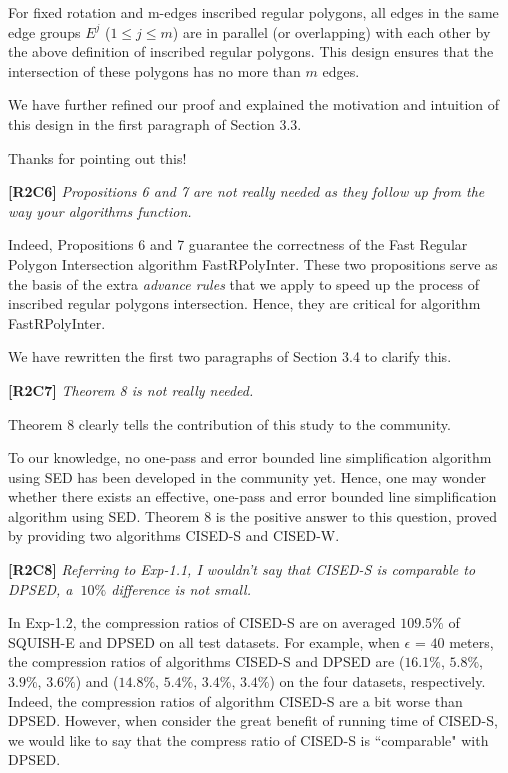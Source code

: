 \documentclass{letter}
\begin{document}
For fixed rotation and m-edges inscribed regular polygons,  all edges in the same edge groups $E^j$ ($1\le j\le m$) are in parallel (or overlapping) with each other by the above definition of inscribed regular polygons. This design ensures that the intersection of these polygons has no more than $m$ edges.

We have further refined our proof and explained the motivation and intuition of this design in the first paragraph of Section 3.3.

Thanks for pointing out this!

\textbf{[R2C6]} \emph{Propositions 6 and 7 are not really needed as they follow up from the way your algorithms function.}

Indeed, Propositions 6 and 7 guarantee the correctness of the Fast Regular Polygon Intersection algorithm FastRPolyInter.
These two propositions serve as the basis of the extra \emph{advance rules} that we apply to speed up the process of inscribed regular polygons intersection. Hence, they are critical for algorithm FastRPolyInter.



We have rewritten the first two paragraphs of Section 3.4 to clarify this.

\textbf{[R2C7]} \emph{Theorem 8 is not really needed.}

Theorem 8 clearly tells the contribution of this study to the community.

To our knowledge, no one-pass and error bounded line simplification algorithm using SED has been developed in the community yet. Hence, one may wonder whether there exists an effective, one-pass and error bounded line simplification algorithm using SED. Theorem 8 is the positive answer to this question, proved by providing two algorithms CISED-S and CISED-W.


\textbf{[R2C8]} \emph{Referring to Exp-1.1, I wouldn't say that CISED-S is comparable to DPSED, a $~10\%$ difference is not small.}

In Exp-1.2, the compression ratios of CISED-S are on averaged $109.5\%$ of SQUISH-E and DPSED on all test datasets. For example, when $\epsilon$ = $40$ meters, the compression ratios of algorithms CISED-S and DPSED are ($16.1\%$, $5.8\%$, $3.9\%$, $3.6\%$) and ($14.8\%$, $5.4\%$, $3.4\%$, $3.4\%$) on the four datasets, respectively. Indeed, the compression ratios of algorithm CISED-S are a bit worse than DPSED. However, when consider the great benefit of running time of CISED-S, we would like to say that the compress ratio of CISED-S is ``comparable" with DPSED.
\end{document}
